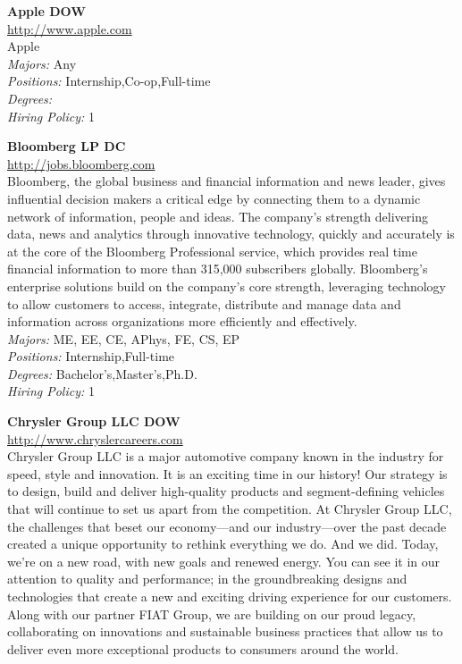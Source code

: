 \documentclass[twoside]{article}
\begin{document}
    \begin{center}\begin{multicols}{2}
    \begin{minipage}{.95\columnwidth}{\Large\bf Apple \hfill DOW}\\
    \url{http://www.apple.com}\\
    Apple\\
    \emph{Majors:} Any\\
    \emph{Positions:} Internship,Co-op,Full-time\\
    \emph{Degrees:} \\
    \emph{Hiring Policy:} 1\\
\end{minipage}
 \begin{minipage}{.95\columnwidth}{\Large\bf Bloomberg LP \hfill DC}\\
    \url{http://jobs.bloomberg.com}\\
    Bloomberg, the global business and financial information and news leader, gives influential decision makers a critical edge by connecting them to a dynamic network of information, people and ideas. The company's strength delivering data, news and analytics through innovative technology, quickly and accurately is at the core of the Bloomberg Professional service, which provides real time financial information to more than 315,000 subscribers globally. Bloomberg's enterprise solutions build on the company's core strength, leveraging technology to allow customers to access, integrate, distribute and manage data and information across organizations more efficiently and effectively.\\
    \emph{Majors:} ME, EE, CE, APhys, FE, CS, EP\\
    \emph{Positions:} Internship,Full-time\\
    \emph{Degrees:} Bachelor's,Master's,Ph.D.\\
    \emph{Hiring Policy:} 1\\
\end{minipage}
 \begin{minipage}{.95\columnwidth}{\Large\bf Chrysler Group LLC \hfill DOW}\\
    \url{http://www.chryslercareers.com}\\
    Chrysler Group LLC is a major automotive company known in the industry for speed, style and innovation. It is an exciting time in our history! Our strategy is to design, build and deliver high-quality products and segment-defining vehicles that will continue to set us apart from the competition. At Chrysler Group LLC, the challenges that beset our economy—and our industry—over the past decade created a unique opportunity to rethink everything we do. And we did. Today, we’re on a new road, with new goals and renewed energy. You can see it in our attention to quality and performance; in the groundbreaking designs and technologies that create a new and exciting driving experience for our customers. Along with our partner FIAT Group, we are building on our proud legacy, collaborating on innovations and sustainable business practices that allow us to deliver even more exceptional products to consumers around the world.\\

\end{minipage}
\end{multicols}
\end{center}
\end{document}
